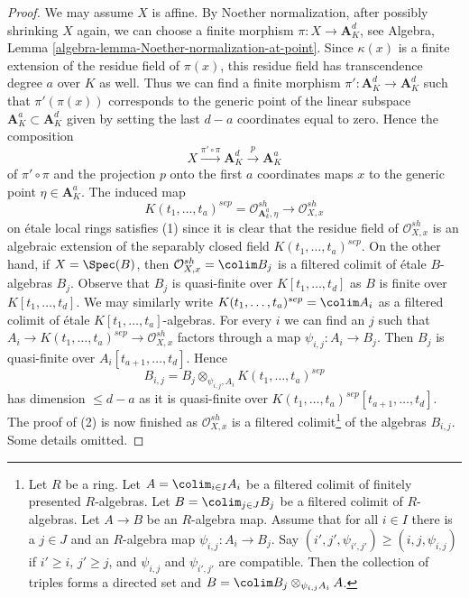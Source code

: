 \begin{proof}
We may assume $X$ is affine. By Noether normalization, after possibly
shrinking $X$ again, we can choose a finite morphism
$\pi : X \to \mathbf{A}^d_K$, see
Algebra, Lemma \ref{algebra-lemma-Noether-normalization-at-point}.
Since $\kappa(x)$ is a finite extension of the residue field of $\pi(x)$,
this residue field has transcendence degree $a$ over $K$ as well.
Thus we can find a finite morphism $\pi' : \mathbf{A}^d_K \to \mathbf{A}^d_K$
such that $\pi'(\pi(x))$ corresponds to the generic point of the linear
subspace $\mathbf{A}^a_K \subset \mathbf{A}^d_K$ given by setting
the last $d - a$ coordinates equal to zero. Hence the composition
$$
X \xrightarrow{\pi' \circ \pi} \mathbf{A}^d_K \xrightarrow{p} \mathbf{A}^a_K
$$
of $\pi' \circ \pi$ and the projection $p$ onto the first $a$ coordinates
maps $x$ to the generic point $\eta \in \mathbf{A}^a_K$. The induced map
$$
K(t_1, \ldots, t_a)^{sep} =
\mathcal{O}_{\mathbf{A}^a_k, \eta}^{sh}
\longrightarrow \mathcal{O}_{X, x}^{sh}
$$
on \'etale local rings satisfies (1) since it is clear that the residue field
of $\mathcal{O}_{X, x}^{sh}$ is an algebraic extension of the separably closed
field $K(t_1, \ldots, t_a)^{sep}$. On the other hand, if $X = \Spec(B)$,
then $\mathcal{O}_{X, x}^{sh} = \colim B_j$ is a filtered colimit
of \'etale $B$-algebras $B_j$. Observe that $B_j$ is quasi-finite over
$K[t_1, \ldots, t_d]$ as $B$ is finite over $K[t_1, \ldots, t_d]$.
We may similarly write
$K(t_1, \ldots, t_a)^{sep} = \colim A_i$ as a filtered colimit
of \'etale $K[t_1, \ldots, t_a]$-algebras. For every $i$ we can
find an $j$ such that
$A_i \to K(t_1, \ldots, t_a)^{sep} \to \mathcal{O}_{X, x}^{sh}$
factors through a map $\psi_{i, j} : A_i \to B_j$. Then $B_j$ is quasi-finite
over $A_i[t_{a + 1}, \ldots, t_d]$. Hence
$$
B_{i, j} = B_j \otimes_{\psi_{i, j}, A_i} K(t_1, \ldots, t_a)^{sep}
$$
has dimension $\leq d - a$ as it is quasi-finite over
$K(t_1, \ldots, t_a)^{sep}[t_{a + 1}, \ldots, t_d]$.
The proof of (2) is now finished as $\mathcal{O}_{X, x}^{sh}$ is a
filtered colimit\footnote{Let $R$ be a ring.
Let $A = \colim_{i \in I} A_i$
be a filtered colimit of finitely presented $R$-algebras.
Let $B = \colim_{j \in J} B_j$ be a filtered colimit of $R$-algebras.
Let $A \to B$ be an $R$-algebra map.
Assume that for all $i \in I$ there is a $j \in J$ and an $R$-algebra map
$\psi_{i, j} : A_i \to B_j$.
Say $(i', j', \psi_{i', j'}) \geq (i, j, \psi_{i, j})$ if
$i' \geq i$, $j' \geq j$, and $\psi_{i, j}$ and $\psi_{i', j'}$
are compatible. Then the collection of triples forms a
directed set and $B = \colim B_j \otimes_{\psi_{i, j} A_i} A$.}
of the algebras $B_{i, j}$. Some details omitted.
\end{proof}

